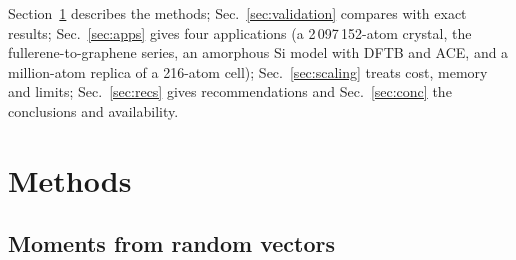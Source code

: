 \documentclass[reprint,nofootinbib,superscriptaddress,amsmath,amssymb,aps,prb,floatfix]{revtex4-2}
\begin{document}
Section~\ref{sec:methods} describes the methods; Sec.~\ref{sec:validation} compares with exact results; Sec.~\ref{sec:apps} gives four applications (a 2\,097\,152-atom crystal, the fullerene-to-graphene series, an amorphous Si model with DFTB and ACE, and a million-atom replica of a 216-atom cell); Sec.~\ref{sec:scaling} treats cost, memory and limits; Sec.~\ref{sec:recs} gives recommendations and Sec.~\ref{sec:conc} the conclusions and availability.

\section{Methods}
\label{sec:methods}

\subsection{Moments from random vectors}
\label{sec:moments}
\end{document}
